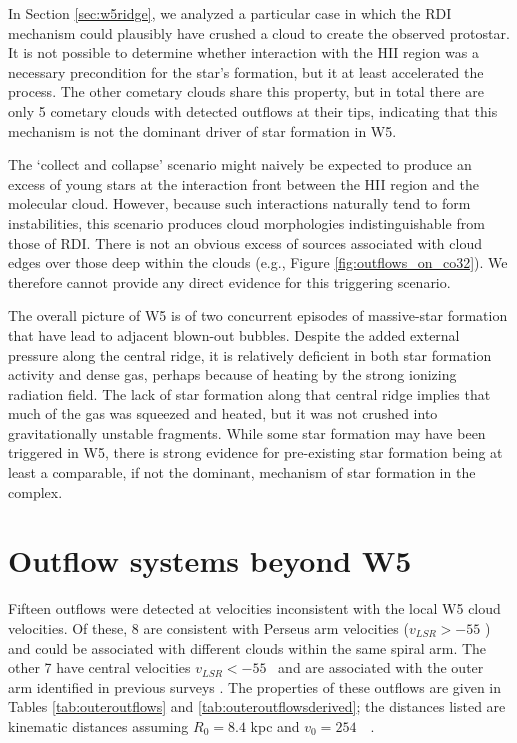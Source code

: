 In Section \ref{sec:w5ridge}, we analyzed a particular case in which the RDI
mechanism could plausibly have crushed a cloud to create the observed
protostar.  
It is not possible to determine whether interaction with the HII region was a 
necessary precondition for the star's formation, but it at least accelerated
the process.  The other cometary clouds share this property,
but in total there are only 5 cometary clouds with detected outflows at their
tips, indicating that this mechanism is not the dominant driver of star
formation in W5.

The `collect and collapse' scenario might naively be expected to produce an
excess of young stars at the interaction front between the HII region and the
molecular cloud.  However, because such interactions naturally tend to form
instabilities, this scenario produces cloud morphologies indistinguishable from
those of RDI.  There is not an obvious excess of sources associated with cloud
edges over those deep within the clouds (e.g., Figure
\ref{fig:outflows_on_co32}).  We therefore cannot provide any direct evidence
for this triggering scenario.

The overall picture of W5 is of two concurrent episodes of massive-star
formation that have lead to adjacent blown-out bubbles.  Despite the added
external pressure along the central ridge, it is relatively deficient in both
star formation activity and dense gas, perhaps because of heating by the strong
ionizing radiation field.  The lack of star formation along that central ridge
implies that much of the gas was squeezed and heated, but it was not crushed
into gravitationally unstable fragments.  While some star formation may have
been triggered in W5, there is strong evidence for pre-existing star formation
being at least a comparable, if not the dominant, mechanism of star formation
in the complex.


\section{Outflow systems beyond W5}
Fifteen outflows were detected at velocities inconsistent with the local W5
cloud velocities.  Of these, 8 are consistent with Perseus arm velocities
($v_{LSR} > -55$ \kms) and could be associated with different clouds within the
same spiral arm.  The other 7 have central velocities $v_{LSR} < -55$ \kms\ and
are associated with the outer arm identified in previous surveys
\citep[e.g.][]{Digel1996}.  The properties of these outflows are given in Tables
\ref{tab:outeroutflows} and \ref{tab:outeroutflowsderived}; the distances listed are kinematic distances assuming
$R_0=8.4$ kpc and $v_0=254$~\kms\ \citep{Reid2009}.

